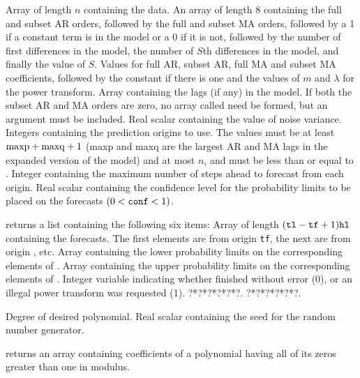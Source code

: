 \Sarg
{} Array of length $n$ containing the data.
 An array of length 8 containing the full and subset AR orders, 
followed by the full and subset MA orders, followed by a 1 if a constant 
term is in the model or a 0 if it is not, followed by the number of first 
differences in the model, the number of $S$th differences in the model, and 
finally the value of $S$.
 Values for full AR, subset AR, full MA and subset MA 
coefficients, followed by the constant if there is one and the values of $m$ 
and $\lambda$ for the power transform.
 Array containing the lags (if any) in the model.  If both the 
subset AR and MA orders are zero, no array called {} need be formed, 
but an argument must be included.
 Real scalar containing the value of noise variance.
 Integers containing the prediction origins to use.  The values 
must be at least ${\rm{maxp}}+{\rm{maxq}}+1$ (maxp and maxq are the largest 
AR and MA lags in the expanded version of the model) and at most $n$, and 
{} must be less than or equal to {}.
 Integer containing the maximum number of steps ahead to forecast 
from each origin.
 Real scalar containing the confidence level for the probability 
limits to be placed on the forecasts $(0<{\tt{conf}}<1)$.

\Sval
\Sitem{ }  returns a list containing the following 
six items:
 Array of length $({\tt{tl}}-{\tt{tf}}+1){\tt{hl}}$ containing 
the forecasts.  The first {} elements are from origin {\tt{tf}}, 
the next {} are from origin {}, etc.
 Array containing the lower probability limits on the corresponding 
elements of {}.
 Array containing the upper probability limits on the corresponding
elements of {}.
 Integer variable indicating whether {} finished
without error (0), or an illegal power transform was requested (1).
 ?*?*?*?*?*?.
 ?*?*?*?*?*?.
%
%


\Sarg
{} Degree of desired polynomial.
 Real scalar containing the seed for the random number generator.

\Sval
\Sitem{ }  returns an array containing coefficients
of a polynomial having all of its zeros greater than one in modulus.
%
%

